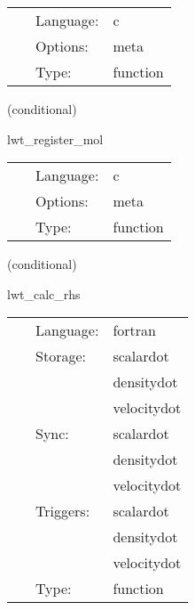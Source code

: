 \documentclass{article}
\begin{document}
\hspace{5mm}

 \begin{tabular*}{160mm}{cll} 
~ & Language:  & c \\ 
~ & Options:  & meta \\ 
~ & Type:  & function \\ 
\end{tabular*} 


\vspace{5mm}

   (conditional) 

\hspace{5mm} lwt\_register\_mol 

\hspace{5mm}{\it register variables with mol } 


\hspace{5mm}

 \begin{tabular*}{160mm}{cll} 
~ & Language:  & c \\ 
~ & Options:  & meta \\ 
~ & Type:  & function \\ 
\end{tabular*} 


\vspace{5mm}

   (conditional) 

\hspace{5mm} lwt\_calc\_rhs 

\hspace{5mm}{\it calculate the rhs } 


\hspace{5mm}

 \begin{tabular*}{160mm}{cll} 
~ & Language:  & fortran \\ 
~ & Storage:  & scalardot \\ 
~& ~ &densitydot\\ 
~& ~ &velocitydot\\ 
~ & Sync:  & scalardot \\ 
~& ~ &densitydot\\ 
~& ~ &velocitydot\\ 
~ & Triggers:  & scalardot \\ 
~& ~ &densitydot\\ 
~& ~ &velocitydot\\ 
~ & Type:  & function \\ 
\end{tabular*} 
\end{document}
